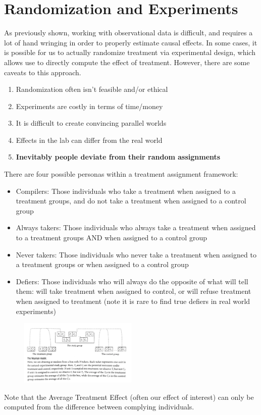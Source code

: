 \section{Randomization and Experiments}

As previously shown, working with observational data is difficult, and requires a lot of hand wringing in order to properly estimate causal effects. In some cases, it is possible for us to actually randomize treatment via experimental design, which allows use to directly compute the effect of treatment. However, there are some caveats to this approach.  

\begin{enumerate}
  \item Randomization often isn't feasible and/or ethical
  \item Experiments are costly in terms of time/money
  \item It is difficult to create convincing parallel worlds
  \item Effects in the lab can differ from the real world
  \item \textbf{Inevitably people deviate from their random assignments}
\end{enumerate}

There are four possible personas within a treatment assignment framework:
\begin{itemize}
  \item Compilers: Those individuals who take a treatment when assigned to a treatment groups, and do not take a treatment when assigned to a control group 
  \item Always takers: Those individuals who always take a treatment when assigned to a treatment groups AND when assigned to a control group
   \item Never takers: Those individuals who never take a treatment when assigned to a treatment groups or when assigned to a control group
  \item Defiers: Those individuals who will always do the opposite of what will tell them: will take treatment when assigned to control, or will refuse treatment when assigned to treatment (note it is rare to find true defiers in real world experiments)
\end{itemize}

\begin{figure}[ht]
  \begin{center}
    \includegraphics[width=0.5\textwidth]{figures/random.png}
  \end{center}
\end{figure}

Note that the Average Treatment Effect (often our effect of interest) can only be computed from the difference between complying individuals. 
